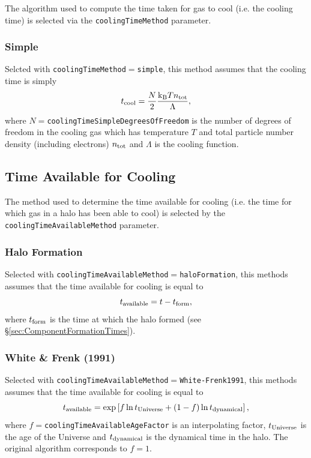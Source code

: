 The algorithm used to compute the time taken for gas to cool (i.e. the cooling time) is selected via the {\tt coolingTimeMethod} parameter.

\subsubsection{Simple}

Selcted with {\tt coolingTimeMethod}$=${\tt simple}, this method assumes that the cooling time is simply
\begin{equation}
 t_{\rm cool} = {N \over 2} {{\rm k}_{\rm B} T n_{\rm tot} \over \Lambda},
\end{equation}
where $N=${\tt coolingTimeSimpleDegreesOfFreedom} is the number of degrees of freedom in the cooling gas which has temperature $T$ and total particle number density (including electrons) $n_{\rm tot}$ and $\Lambda$ is the cooling function.

\subsection{Time Available for Cooling}\label{sec:TimeAvailableCooling}

The method used to determine the time available for cooling (i.e. the time for which gas in a halo has been able to cool) is selected by the {\tt coolingTimeAvailableMethod} parameter.

\subsubsection{Halo Formation}

Selected with {\tt coolingTimeAvailableMethod}$=${\tt haloFormation}, this methods assumes that the time available for cooling is equal to
\begin{equation}
 t_{\rm available} = t - t_{\rm form},
\end{equation}
where $t_{\rm form}$ is the time at which the halo formed (see \S\ref{sec:ComponentFormationTimes}).

\subsubsection{White \& Frenk (1991)}

Selected with {\tt coolingTimeAvailableMethod}$=${\tt White-Frenk1991}, this methods assumes that the time available for cooling is equal to
\begin{equation}
 t_{\rm available} = \exp\left[ f \ln t_{\rm Universe} + (1-f)\ln t_{\rm dynamical} \right],
\end{equation}
where $f=${\tt coolingTimeAvailableAgeFactor} is an interpolating factor, $t_{\rm Universe}$ is the age of the Universe and $t_{\rm dynamical}$ is the dynamical time in the halo. The original \cite{white_galaxy_1991} algorithm corresponds to $f=1$.



